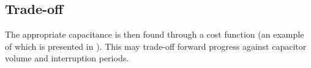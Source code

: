 \subsection{Trade-off}

The appropriate capacitance is then found through a cost function (an example of which is presented in ). 
This may trade-off forward progress against capacitor volume and interruption periods.




